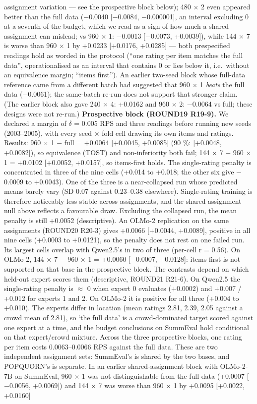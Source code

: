 \documentclass[10pt]{article}
\begin{document}
assignment variation --- see the prospective block below); 480 $\times$ 2 even appeared better than the full data ($-$0.0040 {[}$-$0.0084, $-$0.000001{]}, an interval excluding 0 at a seventh of the budget, which we read as a sign of how much a shared assignment can mislead; vs 960 $\times$ 1: $-$0.0013 {[}$-$0.0073, +0.0039{]}), while 144 $\times$ 7 is worse than 960 $\times$ 1 by +0.0233 {[}+0.0176, +0.0285{]} --- both prespecified readings hold as worded in the protocol (``one rating per item matches the full data'', operationalised as an interval that contains 0 or lies below it, i.e.~without an equivalence margin; ``items first''). An earlier two-seed block whose full-data reference came from a different batch had suggested that 960 $\times$ 1 \emph{beats} the full data ($-$0.0061); the same-batch re-run does not support that stronger claim. (The earlier block also gave 240 $\times$ 4: +0.0162 and 960 $\times$ 2: $-$0.0064 vs full; these designs were not re-run.) \textbf{Prospective block (ROUND19 R19-9).} We declared a margin of $\delta$ = 0.005 RPS and three readings before running new seeds (2003--2005), with every seed $\times$ fold cell drawing its own items and ratings. Results: 960 $\times$ 1 $-$ full = +0.0064 {[}+0.0045, +0.0085{]} (90 \%: {[}+0.0048, +0.0082{]}), so equivalence (TOST) and non-inferiority both fail; 144 $\times$ 7 $-$ 960 $\times$ 1 = +0.0102 {[}+0.0052, +0.0157{]}, so items-first holds. The single-rating penalty is concentrated in three of the nine cells (+0.014 to +0.018; the other six give $-$0.0009 to +0.0043). One of the three is a near-collapsed run whose predicted means barely vary (SD 0.07 against 0.23--0.38 elsewhere). Single-rating training is therefore noticeably less stable across assignments, and the shared-assignment null above reflects a favourable draw. Excluding the collapsed run, the mean penalty is still +0.0052 (descriptive). An OLMo-2 replication on the same assignments (ROUND20 R20-3) gives +0.0066 {[}+0.0044, +0.0089{]}, positive in all nine cells (+0.0003 to +0.0121), so the penalty does not rest on one failed run. Its largest cells overlap with Qwen2.5's in two of three (per-cell r = 0.56). On OLMo-2, 144 $\times$ 7 $-$ 960 $\times$ 1 = +0.0060 {[}$-$0.0007, +0.0128{]}: items-first is not supported on that base in the prospective block. The contrasts depend on which held-out expert scores them (descriptive, ROUND21 R21-6). On Qwen2.5 the single-rating penalty is $\approx$ 0 when expert 0 evaluates (+0.0002) and +0.007 / +0.012 for experts 1 and 2. On OLMo-2 it is positive for all three (+0.004 to +0.010). The experts differ in location (mean ratings 2.81, 2.39, 2.05 against a crowd mean of 2.81), so `the full data' is a crowd-dominated target scored against one expert at a time, and the budget conclusions on SummEval hold conditional on that expert/crowd mixture. Across the three prospective blocks, one rating per item costs 0.0063--0.0066 RPS against the full data. These are two independent assignment sets: SummEval's is shared by the two bases, and POPQUORN's is separate. In an earlier shared-assignment block with OLMo-2-7B on SummEval, 960 $\times$ 1 was not distinguishable from the full data (+0.0007 {[}$-$0.0056, +0.0069{]}) and 144 $\times$ 7 was worse than 960 $\times$ 1 by +0.0095 {[}+0.0022, +0.0160{]} 
\end{document}
